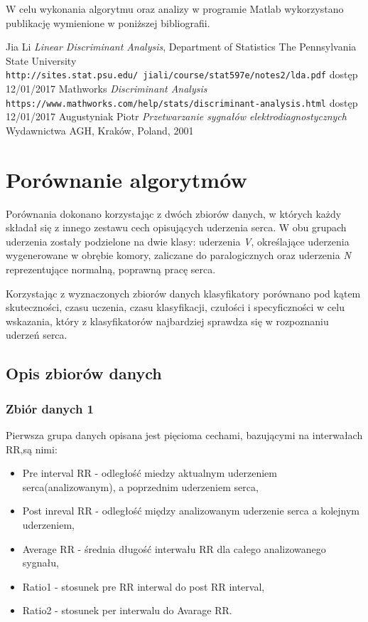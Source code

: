\documentclass[[10pt,a4paper]{article}
\begin{document}
W celu wykonania algorytmu oraz analizy w programie Matlab wykorzystano publikację wymienione w poniższej bibliografii.

\begin{thebibliography}{9}
Jia Li
\textit{Linear Discriminant Analysis}, Department of Statistics
The Pennsylvania State University
\\\texttt {http://sites.stat.psu.edu/~jiali/course/stat597e/notes2/lda.pdf}
dostęp 12/01/2017
Mathworks
\textit{Discriminant Analysis}
\\\texttt {https://www.mathworks.com/help/stats/discriminant-analysis.html}
dostęp 12/01/2017
Augustyniak Piotr
\textit{Przetwarzanie sygnałów elektrodiagnostycznych} 
Wydawnictwa AGH, Kraków, Poland, 2001

\end{thebibliography}




\newpage
\section{Porównanie algorytmów}
Porównania dokonano korzystając z dwóch zbiorów danych, w których każdy składał się z innego zestawu cech opisujących uderzenia serca. W obu grupach uderzenia zostały podzielone na dwie klasy: uderzenia \textit{V}, określające uderzenia wygenerowane w obrębie komory, zaliczane do paralogicznych oraz uderzenia \textit{N} reprezentujące normalną, poprawną pracę serca. 

Korzystając z wyznaczonych zbiorów danych klasyfikatory porównano pod kątem skuteczności, czasu uczenia, czasu klasyfikacji, czułości i specyficzności w celu wskazania, który z klasyfikatorów najbardziej sprawdza się w rozpoznaniu uderzeń serca. 

\subsection{Opis zbiorów danych}
\subsubsection{Zbiór danych 1}
Pierwsza grupa danych opisana jest pięcioma cechami, bazującymi na interwałach RR,są nimi:
\begin{itemize}
\item Pre interval RR - odległość miedzy aktualnym uderzeniem serca(analizowanym), a poprzednim uderzeniem serca,
\item Post inreval RR  - odległość między analizowanym uderzenie serca a kolejnym uderzeniem,
\item Average RR - średnia długość interwału RR dla całego analizowanego sygnału,
\item Ratio1 - stosunek pre RR interwal do post RR interval,
\item Ratio2 - stosunek per interwalu do Avarage RR.
\end{itemize}
\end{document}
